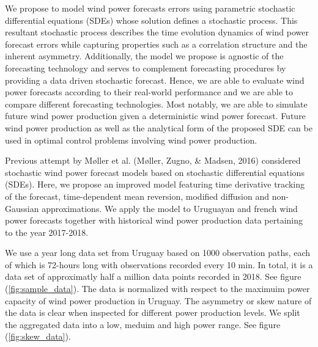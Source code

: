 \documentclass[10pt,twocolumn,letterpaper]{article}
\begin{document}
We propose to model wind power forecasts errors using parametric stochastic differential equations (SDEs) whose solution defines a stochastic process. This resultant stochastic process describes the time evolution dynamics of wind power forecast errors while capturing properties such as a correlation structure and the inherent asymmetry. Additionally, the model we propose is agnostic of the forecasting technology and serves to complement forecasting procedures by providing a data driven stochastic forecast. Hence, we are able to evaluate wind power forecasts according to their real-world performance and we are able to compare different forecasting technologies. Most notably, we are able to simulate future wind power production given a deterministic wind power forecast. Future wind power production as well as the analytical form of the proposed SDE can be used in optimal control problems involving wind power production.

Previous attempt by M\o ller et al. (M\o ller, Zugno, \& Madsen, 2016)  considered stochastic wind power forecast models based on stochastic differential equations (SDEs). Here, we propose an improved model featuring time derivative tracking of the forecast, time-dependent mean reversion, modified diffusion and non-Gaussian approximations. We apply the model to Uruguayan and french wind power forecasts together with historical wind power production data pertaining to the year 2017-2018.

We use a year long data set from Uruguay based on 1000 observation paths, each of which is 72-hours long with observations recorded every 10 min. In total, it is a data set of approximatly half a million data points recorded in 2018. See figure (\ref{fig:sample_data}). The data is normalized with respect to the maximuim power capacity of wind power production in Uruguay. The asymmetry or skew nature of the data is clear when inspected for different power production levels. We split the aggregated data into a low, meduim and high power range. See figure (\ref{fig:skew_data}).
\end{document}
